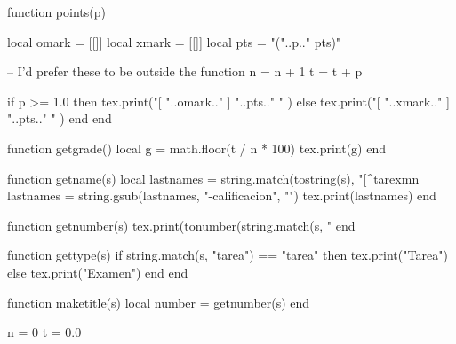 \usepackage[a4paper, top=2cm]{geometry}
\usepackage{pifont}
\usepackage{xfp}
\usepackage[dvipsnames]{xcolor}
\usepackage{titlesec}
\usepackage[most]{tcolorbox}
\usepackage{csvsimple}
\usepackage{luacode}
\usepackage{pdfpages}



\begin{luacode*}

    function points(p)

        local omark = [[{\color{OliveGreen}}]]
        local xmark = [[{\color{Bittersweet}}]]
        local pts = "("..p.." pts)"

        -- I'd prefer these to be outside the function
        n = n + 1
        t = t + p

        if p >= 1.0 then
            tex.print("[ "..omark.." ] "..pts.." " )
        else
            tex.print("[ "..xmark.." ] "..pts.." " )
        end
    end

    function getgrade()
        local g = math.floor(t / n * 100)
        tex.print(g)
    end

    function getname(s)
        local lastnames = string.match(tostring(s), "[^tarexmn%
        lastnames = string.gsub(lastnames, "-calificacion", "")
        tex.print(lastnames)
    end

    function getnumber(s)
        tex.print(tonumber(string.match(s, "%
    end

    function gettype(s)
        if string.match(s, "tarea") == "tarea" then
            tex.print("Tarea")
        else
            tex.print("Examen")
        end
    end

    function maketitle(s)
        local number = getnumber(s)
    end

    n = 0
    t = 0.0

\end{luacode*}


\newcommand{\point}[1]{\item\textbf{\directlua{points(#1)}}}

\newcommand{\gettitle}{
    \directlua{
        gettype(\luastring\jobname)
        getnumber(\luastring\jobname)
    }
    de Heurística 
}

\newcommand{\getauthor}{
    \csvreader[no head, filter equal={\csvcoli}{\directlua{getname(\luastring\jobname)}}]{./students-list.csv}{}{\csvcolii}
}

\newcommand{\getgrade}{\directlua{getgrade()} de 100}

\newcommand{\prettyauthor}[1]{\flushright{\textit{--- #1}}}
